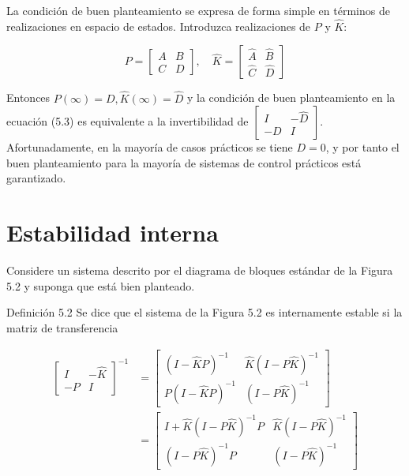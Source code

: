 La condición de buen planteamiento se expresa de forma simple en términos de realizaciones en espacio de estados. Introduzca realizaciones de $P$ y $\hat{K}$:

$$
P=\left[\begin{array}{l|l}
A & B \\
\hline C & D
\end{array}\right], \quad \hat{K}=\left[\begin{array}{c|c}
\hat{A} & \hat{B} \\
\hline \hat{C} & \hat{D}
\end{array}\right]
$$

Entonces $P(\infty)=D, \hat{K}(\infty)=\hat{D}$ y la condición de buen planteamiento en la ecuación (5.3) es equivalente a la invertibilidad de $\left[\begin{array}{cc}I & -\hat{D} \\ -D & I\end{array}\right]$. Afortunadamente, en la mayoría de casos prácticos se tiene $D=0$, y por tanto el buen planteamiento para la mayoría de sistemas de control prácticos está garantizado.

\section{Estabilidad interna}
Considere un sistema descrito por el diagrama de bloques estándar de la Figura 5.2 y suponga que está bien planteado.

Definición 5.2 Se dice que el sistema de la Figura 5.2 es internamente estable si la matriz de transferencia


\begin{align*}
{\left[\begin{array}{cc}
I & -\hat{K} \\
-P & I
\end{array}\right]^{-1} } & =\left[\begin{array}{cc}
(I-\hat{K} P)^{-1} & \hat{K}(I-P \hat{K})^{-1} \\
P(I-\hat{K} P)^{-1} & (I-P \hat{K})^{-1}
\end{array}\right]  \tag{5.4}\\
& =\left[\begin{array}{cc}
I+\hat{K}(I-P \hat{K})^{-1} P & \hat{K}(I-P \hat{K})^{-1} \\
(I-P \hat{K})^{-1} P & (I-P \hat{K})^{-1}
\end{array}\right]
\end{align*}


